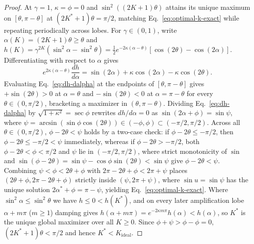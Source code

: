 \begin{proof}
At $\gamma = 1$, $\kappa = \phi = 0$ and $\sin^2((2K + 1)\theta)$ attains its unique maximum on $[\theta, \pi - \theta]$ at $(2K^* + 1)\theta = \pi/2$, matching Eq.~\eqref{eq:optimal-k-exact} while repeating periodically across lobes. For $\gamma \in (0, 1)$, write $\alpha(K) = (2K + 1)\theta \ge \theta$ and $h(K) = \gamma^{2K}(\sin^2\alpha - \sin^2\theta) = \frac{1}{2}e^{-2\kappa(\alpha - \theta)}[\cos(2\theta) - \cos(2\alpha)]$. Differentiating with respect to $\alpha$ gives
\begin{equation}
e^{2\kappa(\alpha - \theta)} \frac{dh}{d\alpha} = \sin(2\alpha) + \kappa\cos(2\alpha) - \kappa\cos(2\theta).
\label{eq:dh-dalpha}
\end{equation}
Evaluating Eq.~\eqref{eq:dh-dalpha} at the endpoints of $[\theta, \pi - \theta]$ gives $+\sin(2\theta) > 0$ at $\alpha = \theta$ and $-\sin(2\theta) < 0$ at $\alpha = \pi - \theta$ for every $\theta \in (0, \pi/2)$, bracketing a maximizer in $(\theta, \pi - \theta)$. Dividing Eq.~\eqref{eq:dh-dalpha} by $\sqrt{1 + \kappa^2} = \sec\phi$ rewrites $dh/d\alpha = 0$ as $\sin(2\alpha + \phi) = \sin\psi$, where $\psi = \arcsin(\sin\phi\cos(2\theta)) \in (-\phi, \phi) \subset (-\pi/2, \pi/2)$. Across all $\theta \in (0, \pi/2)$, $\phi - 2\theta < \psi$ holds by a two-case check: if $\phi - 2\theta \le -\pi/2$, then $\phi - 2\theta \le -\pi/2 < \psi$ immediately, whereas if $\phi - 2\theta > -\pi/2$, both $\phi - 2\theta < \phi < \pi/2$ and $\psi$ lie in $(-\pi/2, \pi/2)$, where strict monotonicity of $\sin$ and $\sin(\phi - 2\theta) = \sin\psi - \cos\phi\sin(2\theta) < \sin\psi$ give $\phi - 2\theta < \psi$. Combining $\psi < \phi < 2\theta + \phi$ with $2\pi - 2\theta + \phi < 2\pi + \psi$ places $(2\theta + \phi, 2\pi - 2\theta + \phi)$ strictly inside $(\psi, 2\pi + \psi)$, where $\sin u = \sin\psi$ has the unique solution $2\alpha^* + \phi = \pi - \psi$, yielding Eq.~\eqref{eq:optimal-k-exact}. Where $\sin^2\alpha \le \sin^2\theta$ we have $h \le 0 < h(K^*)$, and on every later amplification lobe $\alpha + m\pi$ ($m \ge 1$) damping gives $h(\alpha + m\pi) = e^{-2\kappa m\pi}h(\alpha) < h(\alpha)$, so $K^*$ is the unique global maximizer over all $K \ge 0$. Since $\phi + \psi > \phi - \phi = 0$, $(2K^* + 1)\theta < \pi/2$ and hence $K^* < K_{\mathrm{ideal}}$.
\end{proof}

